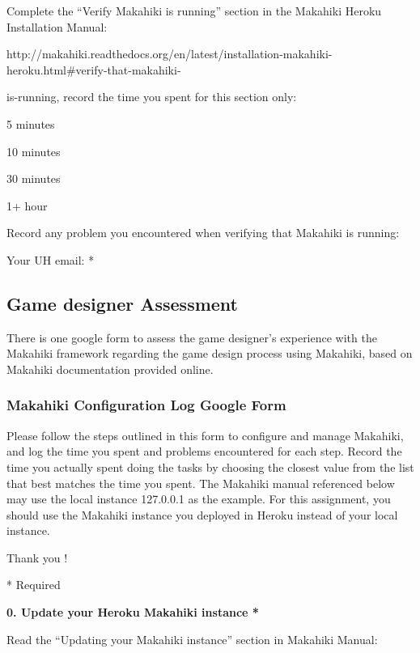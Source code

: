 Complete the ``Verify Makahiki is running'' section in the Makahiki Heroku Installation Manual:

http://makahiki.readthedocs.org/en/latest/installation-makahiki-heroku.html\#verify-that-makahiki-

is-running, record the time you spent for this section only:

\begin{radiobutton}
\item 5 minutes
\item  10 minutes
\item  30 minutes
\item  1+ hour
\end{radiobutton}

Record any problem you encountered when verifying that Makahiki is running: \underline{\hspace{3cm}}

Your UH email: * \underline{\hspace{4cm}}

\subsection{Game designer Assessment}
\label{app:googleform-design}

There is one google form to assess the game designer's experience with the Makahiki framework regarding the game design process using  Makahiki, based on Makahiki documentation provided online.

\subsubsection{Makahiki Configuration Log Google Form}

Please follow the steps outlined in this form to configure and manage Makahiki, and log the time you spent and problems encountered for each step. Record the time you actually spent doing the tasks by choosing the closest value from the list that best matches the time you spent.
The Makahiki manual referenced below may use the local instance 127.0.0.1 as the example. For this assignment, you should use the Makahiki instance you deployed in Heroku instead of your local instance.

Thank you !

* Required

{\bf 0. Update your Heroku Makahiki instance *}

Read the ``Updating your Makahiki instance'' section in Makahiki Manual:

